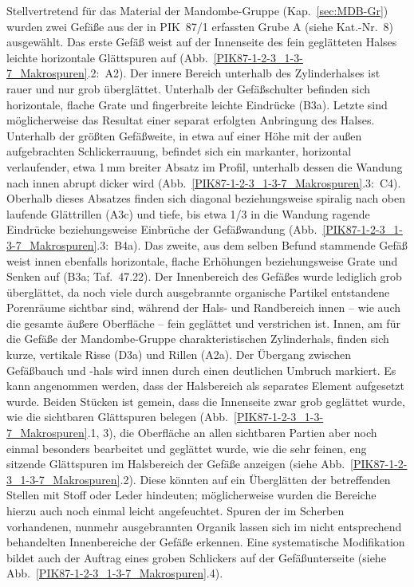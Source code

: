 \begin{multicols}{2}
Stellvertretend für das Material der Mandombe-Gruppe (Kap.~\ref{sec:MDB-Gr}) wurden zwei Gefäße aus der in PIK~87/1 erfassten Grube A (siehe Kat.-Nr.~8) ausgewählt. Das erste Gefäß weist auf der Innenseite des fein geglätteten Halses leichte horizontale Glättspuren auf (Abb.~\ref{PIK87-1-2-3_1-3-7_Makrospuren}.2:~A2). Der innere Bereich unterhalb des Zylinderhalses ist rauer und nur grob überglättet. Unterhalb der Gefäßschulter befinden sich horizontale, flache Grate und fingerbreite leichte Eindrücke (B3a). Letzte sind möglicherweise das Resultat einer separat erfolgten Anbringung des Halses. Unterhalb der größten Gefäßweite, in etwa auf einer Höhe mit der außen aufgebrachten Schlickerrauung, befindet sich ein markanter, horizontal verlaufender, etwa 1\,mm breiter Absatz im Profil, unterhalb dessen die Wandung nach innen abrupt dicker wird (Abb.~\ref{PIK87-1-2-3_1-3-7_Makrospuren}.3:~C4). Oberhalb dieses Absatzes finden sich diagonal beziehungsweise spiralig nach oben laufende Glättrillen (A3c) und tiefe, bis etwa 1/3 in die Wandung ragende Eindrücke beziehungsweise Einbrüche der Gefäßwandung (Abb.~\ref{PIK87-1-2-3_1-3-7_Makrospuren}.3:~B4a). Das zweite, aus dem selben Befund stammende Gefäß weist innen ebenfalls horizontale, flache Erhöhungen beziehungsweise Grate und Senken auf (B3a; Taf.~47.22). Der Innenbereich des Gefäßes wurde lediglich grob überglättet, da noch viele durch ausgebrannte organische Partikel entstandene Porenräume sichtbar sind, während der Hals- und Randbereich innen -- wie auch die gesamte äußere Oberfläche -- fein geglättet und verstrichen ist. Innen, am für die Gefäße der Mandombe-Gruppe charakteristischen Zylinderhals, finden sich kurze, vertikale Risse (D3a) und Rillen (A2a). Der Übergang zwischen Gefäßbauch und -hals wird innen durch einen deutlichen Umbruch markiert. Es kann angenommen werden, dass der Halsbereich als separates Element aufgesetzt wurde. Beiden Stücken ist gemein, dass die Innenseite zwar grob geglättet wurde, wie die sichtbaren Glättspuren belegen (Abb.~\ref{PIK87-1-2-3_1-3-7_Makrospuren}.1, 3), die Oberfläche an allen sichtbaren Partien aber noch einmal besonders bearbeitet und geglättet wurde, wie die sehr feinen, eng sitzende Glättspuren im Halsbereich der Gefäße anzeigen (siehe Abb.~\ref{PIK87-1-2-3_1-3-7_Makrospuren}.2). Diese könnten auf ein Überglätten der betreffenden Stellen mit Stoff oder Leder hindeuten; möglicherweise wurden die Bereiche hierzu auch noch einmal leicht angefeuchtet. Spuren der im Scherben vorhandenen, nunmehr ausgebrannten Organik lassen sich im nicht entsprechend behandelten Innenbereiche der Gefäße erkennen. Eine systematische Modifikation bildet auch der Auftrag eines groben Schlickers auf der Gefäßunterseite (siehe Abb.~\ref{PIK87-1-2-3_1-3-7_Makrospuren}.4).


\end{multicols}
